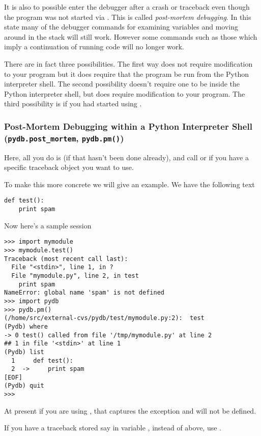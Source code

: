 It is also to possible enter the debugger after a crash or traceback
even though the program was not started via . This is
called \emph{post-mortem debugging}. In this state many of the
debugger commands for examining variables and moving around in the
stack will still work. However some commands such as those which imply
a continuation of running code will no longer work.

There are in fact three possibilities. The first way does not require
modification to your program but it does require that the program be
run from the Python interpreter shell. The second possibility doesn't
require one to be inside the Python interpreter shell, but does
require modification to your program. The third possibility is if you
had started using .

\subsubsection{Post-Mortem Debugging within a Python Interpreter Shell
({\tt pydb.post_mortem}, {\tt pydb.pm()})}

Here, all you do is  (if that hasn't been done
already), and call  or  if you
have a specific traceback object you want to use.

To make this more concrete we will give an example. We have the
following text 

\begin{verbatim}
def test():
    print spam
\end{verbatim}

Now here's a sample session

\begin{verbatim}
>>> import mymodule
>>> mymodule.test()
Traceback (most recent call last):
  File "<stdin>", line 1, in ?
  File "mymodule.py", line 2, in test
    print spam
NameError: global name 'spam' is not defined
>>> import pydb
>>> pydb.pm()
(/home/src/external-cvs/pydb/test/mymodule.py:2):  test
(Pydb) where
-> 0 test() called from file '/tmp/mymodule.py' at line 2
## 1 in file '<stdin>' at line 1
(Pydb) list
  1     def test():
  2  ->     print spam
[EOF]
(Pydb) quit
>>> 
\end{verbatim}

At present if you are using , that captures the
exception and  will not be defined.

If you have a traceback stored say in variable , instead of 
 above, use .

